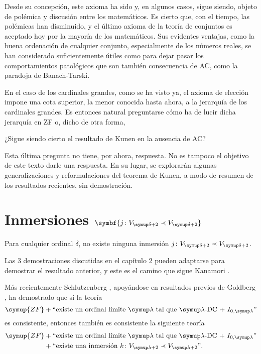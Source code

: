Desde su concepción, este axioma ha sido y, en algunos casos,
sigue siendo, objeto de polémica y discusión entre los matemáticos.
Es cierto que, con el tiempo, las polémicas han disminuido, y el último
axioma de la teoría de conjuntos es aceptado hoy por la mayoría
de los matemáticos.
Sus evidentes ventajas, como la buena ordenación de cualquier conjunto,
especialmente de los números reales, se han considerado suficientemente útiles
como para dejar pasar los comportamientos patológicos que son
también consecuencia de AC, como la paradoja de Banach-Tarski.

En el caso de los cardinales grandes, como se ha visto ya,
el axioma de elección impone una cota superior, la menor conocida hasta ahora,
a la jerarquía de los cardinales grandes. Es entonces natural preguntarse
cómo ha de lucir dicha jerarquía en ZF o,
dicho de otra forma,

\begin{ques}\label{ques:open}
¿Sigue siendo cierto el resultado de Kunen en la ausencia de AC?
\end{ques}

Esta última pregunta no tiene, por ahora, respuesta. No es tampoco
el objetivo de este texto darle una respuesta. En su lugar,
se explorarán algunas generalizaciones y reformulaciones del teorema
de Kunen, a modo de resumen de los resultados recientes, sin demostración.

\section%
{%
    Inmersiones \texorpdfstring{$\symbf{j\colon V_{\delta+2}\embed V_{\delta+2}}$}{j: V-> V}
}

\begin{teo}
    Para cualquier ordinal $\delta$, no existe ninguna inmersión
    $j\colon V_{\delta+2}\embed V_{\delta+2}$.
\end{teo}

Las 3 demostraciones discutidas en el capítulo 2 pueden adaptarse para demostrar
el resultado anterior, y este es el camino que sigue Kanamori
\autocite[Corolario 23.14]{kanamori_higher_2009}.

Más recientemente Schlutzenberg \autocite{schlutzenberg_consistency_2024},
apoyándose en resultados previos de Goldberg \autocite{goldberg_even_2021},
ha demostrado que si la teoría
\[
    \symup{ZF} + \text{``existe un ordinal límite $\lambda$ tal que $\lambda$-DC~+~$I_{0,\lambda}$''}
\]
es consistente, entonces también es consistente la siguiente teoría
\begin{align*}
    \symup{ZF} &+ \text{``existe un ordinal límite $\lambda$ tal que $\lambda$-DC~+~$I_{0,\lambda}$''}\\
               &+ \text{``existe una inmersión $k\colon V_{\lambda+2}\embed V_{\lambda+2}$''}.
\end{align*}

